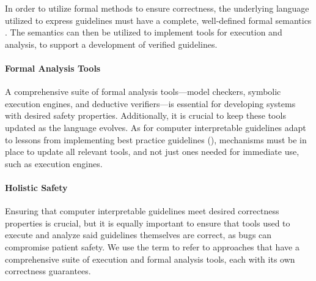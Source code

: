 In order to utilize formal methods to ensure \CDSS{} correctness,
the underlying language utilized to express guidelines must have
a complete, well-defined formal semantics \cite{ShaharAMIA96}. The
semantics can then be utilized to implement tools for execution and analysis,
to support a development of verified guidelines.

\paragraph{Formal Analysis Tools}

A comprehensive suite of formal analysis tools---model checkers,
symbolic execution engines, and deductive verifiers---is essential for
developing systems with desired safety properties.
Additionally, it is crucial to keep these tools updated as the language evolves.
As \DSLs{} for computer interpretable guidelines adapt
to lessons from implementing best practice guidelines (\BPGs{}),
mechanisms must be in place to update all relevant tools, and not just
ones needed for immediate use, such as execution engines.

\paragraph{Holistic Safety}

Ensuring that computer interpretable guidelines
meet desired correctness properties is crucial,
but it is equally important to ensure that tools used
to execute and analyze said guidelines themselves are correct,
as bugs can compromise patient safety.
We use the term  to refer to approaches that
have a comprehensive suite of execution and formal analysis tools,
each with its own correctness guarantees.

